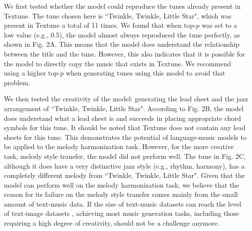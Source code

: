 \documentclass[letterpaper]{article} %
\begin{document}
We first tested whether the model could reproduce the tunes already present in Textune. The tune chosen here is ``Twinkle, Twinkle, Little Star", which was present in Textune a total of 11 times. We found that when top-$p$ was set to a low value (e.g., 0.5), the model almost always reproduced the tune perfectly, as shown in Fig. 2A. This means that the model does understand the relationship between the title and the tune. However, this also indicates that it is possible for the model to directly copy the music that exists in Textune. We recommend using a higher top-$p$ when generating tunes using this model to avoid that problem.

We then tested the creativity of the model: generating the lead sheet and the jazz arrangement of ``Twinkle, Twinkle, Little Star". According to Fig. 2B, the model does understand what a lead sheet is and succeeds in placing appropriate chord symbols for this tune. It should be noted that Textune does not contain any lead sheets for this tune. This demonstrates the potential of language-music models to be applied to the melody harmonization task. However, for the more creative task, melody style transfer, the model did not perform well. The tune in Fig. 2C, although it does have a very distinctive jazz style (e.g., rhythm, harmony), has a completely different melody from  ``Twinkle, Twinkle, Little Star". Given that the model can perform well on the melody harmonization task, we believe that the reason for its failure on the melody style transfer comes mainly from the small amount of text-music data. If the size of text-music datasets can reach the level of text-image datasets \cite{DBLP:journals/corr/abs-2111-02114}, achieving most music generation tasks, including those requiring a high degree of creativity, should not be a challenge anymore.
\end{document}
